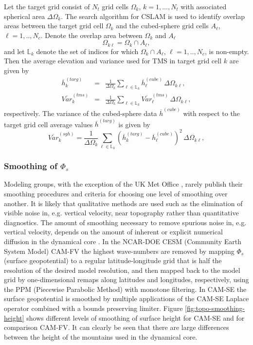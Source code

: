 \documentclass[gmd]{copernicus}
\begin{document}
Let the target grid consist of $N_t$ grid cells $\Omega_k$, $k=1, ..., N_t$ with associated spherical area $\Delta \Omega_k$. The search algorithm for CSLAM is used to identify overlap areas between the target grid cell $\Omega_k$ and the cubed-sphere grid cells $A_\ell$, $\ell=1,..,N_c$. Denote the overlap area between $\Omega_k$ and $A_\ell$
\begin{equation}
\Omega_{k\ell}=\Omega_k \cap A_\ell,
\end{equation}
and let $\mathbb{L}_k$ denote the set of indices for which $\Omega_k \cap A_\ell$, $\ell=1,..,N_c$, is non-empty. Then the average elevation and variance used for TMS in target grid cell $k$ are given by
\begin{eqnarray}
\overline{h}^{(targ)}_k&=&\frac{1}{\Delta \Omega_k}\sum_{\ell\in {\mathbb{L}}_k}\overline{h}^{(cube)}_\ell\, \Delta \Omega_{k\ell},\\
\overline{Var}^{(tms)}_k&=&\frac{1}{\Delta \Omega_k}\sum_{\ell\in {\mathbb{L}}_k}\overline{Var}^{(tms)}_\ell\, \Delta \Omega_{k\ell},
\end{eqnarray}
respectively. The variance of the cubed-sphere data $\overline{h}^{(cube)}$ with respect to the target grid cell average values $\overline{h}^{(targ)}$ is given by
\begin{equation}
\overline{Var}^{(sgh)}_k=\frac{1}{\Delta \Omega_k}\sum_{\ell\in {\mathbb{L}}_k}\left( \overline{h}^{(targ)}_k-\overline{h}^{(cube)}_\ell\right)^2\, \Delta \Omega_{k\ell},
\end{equation}

\subsubsection{Smoothing of $\Phi_s$}\label{sec:smoothing}
Modeling groups, with the exception of the UK Met Office \citep{WBCJ2003QJRMS}, rarely publish their smoothing procedures and criteria for choosing one level of smoothing over another. It is likely that qualitative methods are used such as the elimination of visible noise in, e.g. vertical velocity, near topography rather than quantitative diagnostics. The amount of smoothing necessary to remove spurious noise in, e.g. vertical velocity, depends on the amount of inherent or explicit numerical diffusion in the dynamical core \citep[e.g., ][]{L2011IJHPC}. In the NCAR-DOE CESM (Community Earth System Model) CAM-FV \citep[Community Atmosphere Model - Finite-Volume; ][]{L2004MWR} the highest wave-numbers are removed by mapping $\Phi_s$ (surface geopotential) to a regular latitude-longitude grid that is half the resolution of the desired model resolution, and then mapped back to the model grid by one-dimensional remaps along latitudes and longitudes, respectively, using the PPM (Piecewise Parabolic Method) with monotone filtering. In CAM-SE \citep[Community Atmosphere Model - Spectral-Elements;][]{DetAl2012IJHPCA,CAM5} the surface geopotential is smoothed by multiple applications of the CAM-SE Laplace operator combined with a bounds preserving limiter. Figure \ref{fig:topo-smoothing-height} shows different levels of smoothing of surface height for CAM-SE and for comparison CAM-FV. It can clearly be seen that there are large differences between the height of the mountains used in the dynamical core. 
\end{document}
